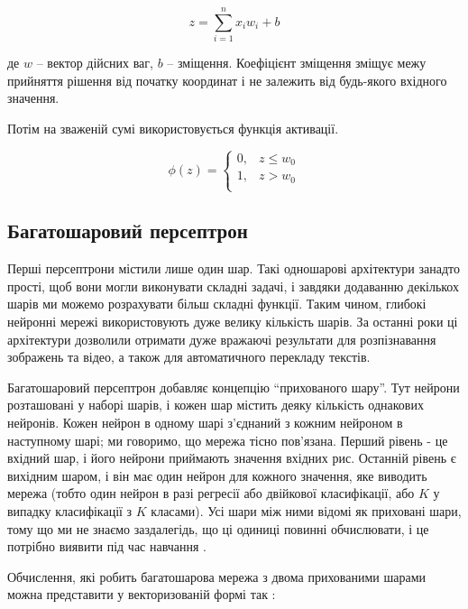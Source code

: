 \begin{equation}
    z = \sum^n_{i=1} x_i w_i + b
    \label{eq:perceptron1}
\end{equation}

де $w$ -- вектор дійсних ваг, $b$ -- зміщення.
Коефіцієнт зміщення зміщує межу прийняття рішення
від початку координат і не залежить від будь-якого
вхідного значення.

Потім на зваженій сумі використовується функція активації.

\begin{equation}
    \phi(z) = \begin{cases}
        0 ,& z \le w_0 \\
        1 ,& z > w_0 \\
    \end{cases}
    \label{eq:perceptron2}
\end{equation}

\subsection{Багатошаровий персептрон}
Перші персептрони містили лише один шар. Такі одношарові
архітектури занадто прості, щоб вони могли виконувати складні задачі,
і завдяки додаванню декількох шарів ми можемо розрахувати більш складні
функції. Таким чином, глибокі нейронні мережі використовують дуже
велику кількість шарів. За останні роки ці архітектури дозволили
отримати дуже вражаючі результати для розпізнавання зображень та
відео, а також для автоматичного перекладу текстів.

Багатошаровий персептрон добавляє концепцію
``прихованого шару''. Тут нейрони розташовані у наборі шарів,
і кожен шар містить деяку кількість однакових нейронів.
Кожен нейрон в одному шарі з'єднаний з кожним нейроном в наступному шарі;
ми говоримо, що мережа тісно пов’язана. Перший рівень - це вхідний шар,
і його нейрони приймають значення вхідних рис. 
Останній рівень є вихідним шаром, і він має один нейрон для
кожного значення, яке виводить мережа (тобто один нейрон
в разі регресії або двійкової
класифікації, або $K$  у випадку класифікації з $K$ класами).
Усі шари між ними відомі як приховані шари, тому що ми не знаємо
заздалегідь, що ці одиниці повинні обчислювати, і це потрібно
виявити під час навчання \cite{nn:multilayer-perceptrons}.

Обчислення, які робить багатошарова мережа з двома
прихованими шарами можна
представити у векторизованій формі так \cite{nn:multilayer-perceptrons}:

